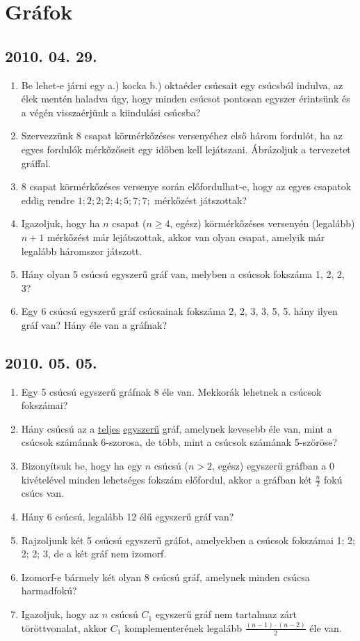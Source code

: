 \documentclass{article}
\begin{document}
\section*{Gráfok}

\subsection*{2010. 04. 29.}
\begin{enumerate}
\item Be lehet-e járni egy a.) kocka b.) oktaéder csúcsait egy csúcsból indulva, az élek mentén haladva úgy, hogy minden csúcsot pontosan egyszer érintsünk és a végén visszaérjünk a kiindulási csúcsba?
\item Szervezzünk 8 csapat körmérkőzéses versenyéhez első három fordulót, ha az egyes fordulók mérkőzőseit egy időben kell lejátszani. Ábrázoljuk a tervezetet gráffal.
\item 8 csapat körmérkőzéses versenye során előfordulhat-e, hogy az egyes csapatok eddig rendre $1; 2; 2; 2; 4; 5; 7; 7;$ mérkőzést játszottak?
\item Igazoljuk, hogy ha $n$ csapat ($n\geq 4$, egész) körmérkőzéses versenyén (legalább) $n+1$ mérkőzést már lejátszottak, akkor van olyan csapat, amelyik már legalább háromszor játszott.
\item Hány olyan 5 csúcsú egyszerű gráf van, melyben a csúcsok fokszáma 1, 2, 2, 3?
\item Egy 6 csúcsú egyszerű gráf csúcsainak fokszáma 2, 2, 3, 3, 5, 5. hány ilyen gráf van? Hány éle van a gráfnak?
\end{enumerate}


\subsection*{2010. 05. 05.}
\begin{enumerate}
\item Egy 5 csúcsú egyszerű gráfnak 8 éle van. Mekkorák lehetnek a csúcsok fokszámai?
\item Hány csúcsú az a \underline{teljes} \underline{egyszerű} gráf, amelynek kevesebb éle van, mint a csúcsok számának 6-szorosa, de több, mint a csúcsok számának 5-szöröse?
\item Bizonyítsuk be, hogy ha egy $n$ csúcsú ($n>2$, egész) egyszerű gráfban a 0 kivételével minden lehetséges fokszám előfordul, akkor a gráfban két $\frac{n}{2}$ fokú csúcs van.
\item Hány 6 csúcsú, legalább 12 élű egyszerű gráf van?
\item Rajzoljunk két 5 csúcsú egyszerű gráfot, amelyekben a csúcsok fokszámai 1; 2; 2; 2; 3, de a két gráf nem izomorf.
\item Izomorf-e bármely két olyan 8 csúcsú gráf, amelynek minden csúcsa harmadfokú?
\item Igazoljuk, hogy az $n$ csúcsú $C_1$ egyszerű gráf nem tartalmaz zárt töröttvonalat, akkor $C_1$ komplementerének legalább $\frac{(n-1)\cdot(n-2)}{2}$ éle van.
\end{enumerate}
\end{document}
